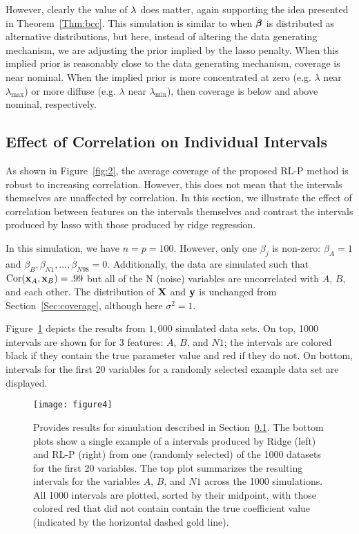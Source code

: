 However, clearly the value of $\lambda$ does matter, again supporting the idea presented in Theorem~\ref{Thm:bcc}. This simulation is similar to when $\boldsymbol{\beta}$ is distributed as alternative distributions, but here, instead of altering the data generating mechanism, we are adjusting the prior implied by the lasso penalty. When this implied prior is reasonably close to the data generating mechanism, coverage is near nominal. When the implied prior is more concentrated at zero (e.g. $\lambda$ near $\lambda_{\max}$) or more diffuse (e.g. $\lambda$ near $\lambda_{\min}$), then coverage is below and above nominal, respectively.

\subsection{Effect of Correlation on Individual Intervals} \label{Sec:Ridge}

As shown in Figure~\ref{fig:2}, the average coverage of the proposed RL-P method is robust to increasing correlation. However, this does not mean that the intervals themselves are unaffected by correlation. In this section, we illustrate the effect of correlation between features on the intervals themselves and contrast the intervals produced by lasso with those produced by ridge regression.

In this simulation, we have $n = p = 100$. However, only one $\beta_j$ is non-zero: $\beta_{A} = 1$ and $\beta_{B}, \beta_{N1}, \ldots, \beta_{N98} = 0$. Additionally, the data are simulated such that $\textrm{Cor}(\mathbf{x}_{A}, \mathbf{x}_{B}) = .99$ but all of the N (noise) variables are uncorrelated with $A$, $B$, and each other. The distribution of $\mathbf{X}$ and $\mathbf{y}$ is unchanged from Section~\ref{Sec:coverage}, although here $\sigma^2 = 1$.

Figure~\ref{fig:4} depicts the results from $1,000$ simulated data sets. On top, 1000 intervals are shown for for 3 features: $A$, $B$, and $N1$; the intervals are colored black if they contain the true parameter value and red if they do not. On bottom, intervals for the first 20 variables for a randomly selected example data set are displayed.

\begin{figure}[htb!]
  \begin{center}
    \texttt{[image: figure4]}
    \caption{\label{fig:4}
      Provides results for simulation described in Section~\ref{Sec:Ridge}. The bottom plots show a single example of a intervals produced by Ridge (left) and RL-P (right) from one (randomly selected) of the 1000 datasets for the first 20 variables. The top plot summarizes the resulting intervals for the variables $A$, $B$, and $N1$ across the 1000 simulations. All 1000 intervals are plotted, sorted by their midpoint, with those colored red that did not contain contain the true coefficient value (indicated by the horizontal dashed gold line).
    }
  \end{center}
\end{figure}

